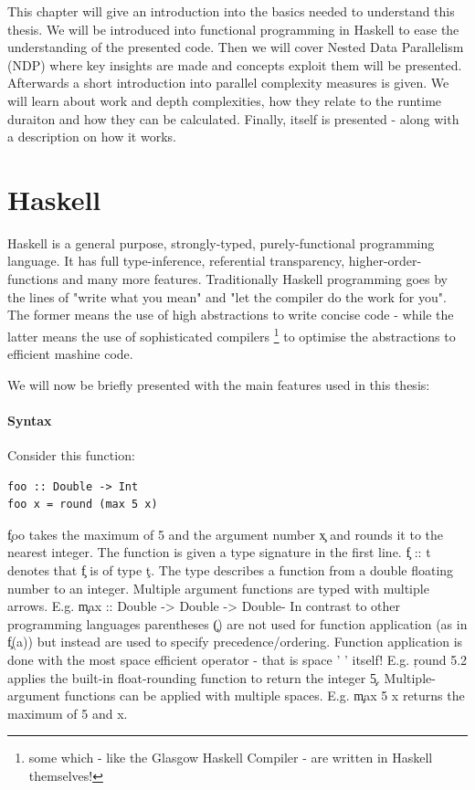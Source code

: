 

This chapter will give an introduction into the basics needed to
understand this thesis. We will be introduced into functional programming
in Haskell to ease the understanding of the presented code.
Then we will cover Nested Data Parallelism (NDP) where
key insights are made and concepts exploit them will be presented.
Afterwards a short introduction into parallel complexity measures is given.
We will learn about work and depth complexities, how they relate
to the runtime duraiton and how they can be calculated.
Finally, \algo itself is presented - along with
a description on how it works.

\section{Haskell}
  Haskell is a general purpose, strongly-typed, purely-functional programming
  language. It has full type-inference, referential transparency, higher-order-functions
  and many more features. Traditionally Haskell programming goes by the lines of
  "write what you mean" and "let the compiler do the work for you".
  The former means the use of high abstractions to write concise code -
  while the latter means the use of sophisticated compilers
  \footnote{some which - like the Glasgow Haskell Compiler -  are written in Haskell themselves!}
  to optimise the abstractions to efficient mashine code.
  
  We will now be briefly presented with the main features used in this thesis:
  \paragraph{Syntax}
  Consider this function:
  \begin{lstlisting}
foo :: Double -> Int
foo x = round (max 5 x)
  \end{lstlisting}
  \c{foo} takes the maximum of 5 and the argument number \c{x} and
  rounds it to the nearest integer. The function is given a type
  signature in the first line. \c{f :: t} denotes that \c{f} is of type \c{t}.
  The type describes a function from a double floating number
  to an integer. Multiple argument functions are typed with multiple arrows.
  E.g. \c{max :: Double -> Double -> Double}-
  In contrast to other programming languages parentheses \c{()} are not used for function application
  (as in \c{f(a)}) but instead are used to specify precedence/ordering.
  Function application is done with the most space efficient operator
  - that is space ' ' itself! E.g. \c{round 5.2} applies the built-in
  float-rounding function to return the integer \c{5}. Multiple-argument
  functions can be applied with multiple spaces. E.g. \c{max 5 x}
  returns the maximum of 5 and x.
  
